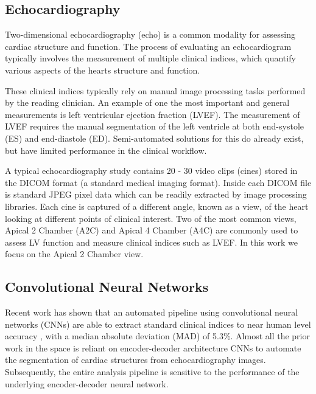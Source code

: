 \subsection{Echocardiography}
Two-dimensional echocardiography (echo) is a common modality for assessing
cardiac structure and function. The process of evaluating an echocardiogram
typically involves the measurement of multiple clinical indices, which quantify
various aspects of the hearts structure and function. \newline

These clinical indices typically rely on manual image processing tasks performed
by the reading clinician. An example of one the most important and general
measurements is left ventricular ejection fraction (LVEF). The measurement of
LVEF requires the manual segmentation of the left ventricle at both end-systole
(ES) and end-diastole (ED). Semi-automated solutions for this do already exist,
but have limited performance in the clinical workflow. \newline

A typical echocardiography study contains 20 - 30 video clips (cines) stored in
the DICOM format (a standard medical imaging format). Inside each DICOM file is
standard JPEG pixel data which can be readily extracted by image processing
libraries. Each cine is captured of a different angle, known as a view, of the
heart looking at different points of clinical interest. Two of the most common
views, Apical 2 Chamber (A2C) and Apical 4 Chamber (A4C) are commonly used to
assess LV function and measure clinical indices such as LVEF. In this work we
focus on the Apical 2 Chamber view.\newline

\subsection{Convolutional Neural Networks}

Recent work has shown that an automated pipeline using convolutional neural
networks (CNNs) are able to extract standard clinical indices to near human
level accuracy \cite{zhangFullyAutomatedEchocardiogram2018}, with a median
absolute deviation (MAD) of 5.3\%. Almost all the prior work in the space is
reliant on encoder-decoder architecture CNNs to automate the segmentation of
cardiac structures from echocardiography images. Subsequently, the entire
analysis pipeline is sensitive to the performance of the underlying
encoder-decoder neural network. \newline

